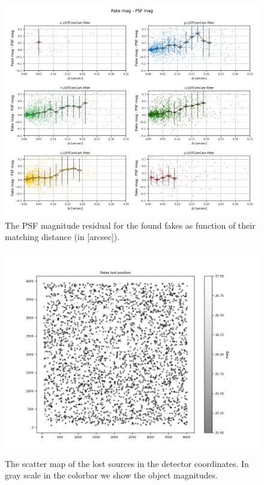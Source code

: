 \begin{figure}
    \centering
    \includegraphics[width=0.95\linewidth]{dia/figures/scatter_dist_psf_mag_perfilter.png}
    \caption{The PSF magnitude residual for the found fakes as function of their matching distance (in [arcsec]).}
    \label{fig:photometric_recovery_vs_astrometric_dist}
\end{figure}

\begin{figure}
    \centering
    \includegraphics[width=0.95\linewidth]{dia/figures/lost_sources_detector_map.png}
    \caption{The scatter map of the lost sources in the detector coordinates. In gray scale in the colorbar we show the object magnitudes.}
    \label{fig:lost_sources_xy}
\end{figure}


